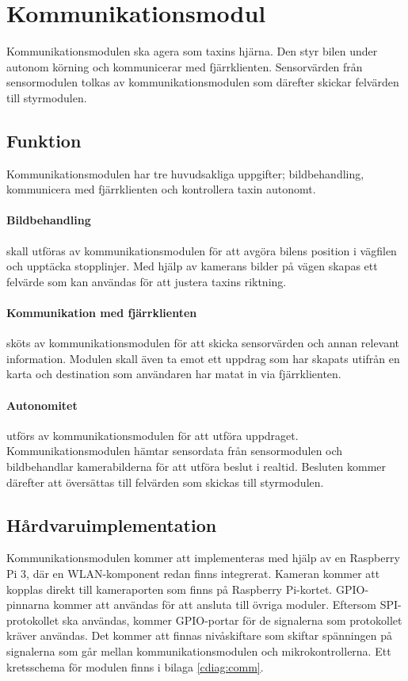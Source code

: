 \documentclass[designspec/spec.tex]{subfiles}
\begin{document}
\section{Kommunikationsmodul}
Kommunikationsmodulen ska agera som taxins hjärna. Den styr bilen under autonom
körning och kommunicerar med fjärrklienten. Sensorvärden från sensormodulen
tolkas av kommunikationsmodulen som därefter skickar felvärden till
styrmodulen.

\subsection{Funktion}
Kommunikationsmodulen har tre huvudsakliga uppgifter; bildbehandling,
kommunicera med fjärrklienten och kontrollera taxin autonomt.

\paragraph{Bildbehandling} skall utföras av kommunikationsmodulen för att
avgöra bilens position i vägfilen och upptäcka stopplinjer. Med hjälp av
kamerans bilder på vägen skapas ett felvärde som kan användas för att justera
taxins riktning.

\paragraph{Kommunikation med fjärrklienten} sköts av kommunikationsmodulen för
att skicka sensorvärden och annan relevant information. Modulen skall även ta
emot ett uppdrag som har skapats utifrån en karta och destination som
användaren har matat in via fjärrklienten.

\paragraph{Autonomitet} utförs av kommunikationsmodulen för att utföra
uppdraget. Kommunikationsmodulen hämtar sensordata från sensormodulen och
bildbehandlar kamerabilderna för att utföra beslut i realtid. Besluten kommer
därefter att översättas till felvärden som skickas till styrmodulen.

\subsection{Hårdvaruimplementation} 
Kommunikationsmodulen kommer att implementeras med hjälp av en Raspberry Pi 3,
där en WLAN-komponent redan finns integrerat. Kameran kommer att kopplas direkt
till kameraporten som finns på Raspberry Pi-kortet. GPIO-pinnarna kommer att
användas för att ansluta till övriga moduler.  Eftersom SPI-protokollet ska
användas, kommer GPIO-portar för de signalerna som protokollet kräver användas.
Det kommer att finnas nivåskiftare som skiftar spänningen på signalerna som går
mellan kommunikationsmodulen och mikrokontrollerna. Ett kretsschema för modulen
finns i bilaga \ref{cdiag:comm}.
\end{document}
